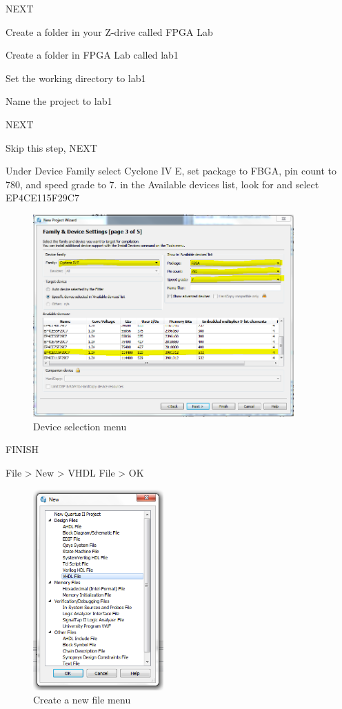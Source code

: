 NEXT

Create a folder in your Z-drive called FPGA Lab

Create a folder in FPGA Lab called lab1

Set the working directory to lab1

Name the project to lab1

NEXT

Skip this step, NEXT

Under Device Family select Cyclone IV E, set package to FBGA, pin count to 780, and speed grade to 7. 
in the Available devices list, look for and select EP4CE115F29C7 

\begin{figure}[H]
	\centering
	\includegraphics[width=100mm]{Lab1/figures/step2.png}
	\caption{Device selection menu}
	\label{fig:step2}
\end{figure}

FINISH

File > New > VHDL File > OK %

\begin{figure}[H]
	\centering
	\includegraphics[width=50mm]{Lab1/figures/newfile.png}
	\caption{Create a new file menu}
	\label{fig:newfile}
\end{figure}


